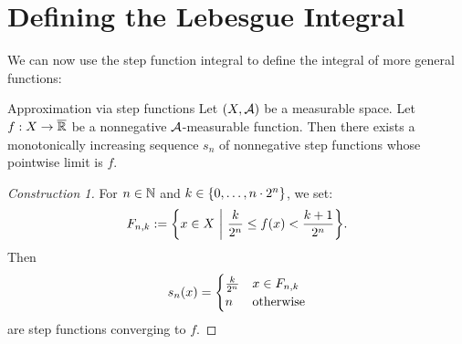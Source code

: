 \section{Defining the Lebesgue Integral}
We can now use the step function integral to define the integral of more general functions:
\begin{importanttheorem}{Approximation via step functions}{}
	Let $(X, \mathcal{A})$ be a measurable space. Let $f : X \to \overline{{\mathbb{R}}}$ be a nonnegative $\mathcal{A}$-measurable function. Then there exists a monotonically increasing sequence $s_n$ of nonnegative step functions whose pointwise limit is $f$.
\end{importanttheorem}
\begin{proof}[Construction 1]
	For $n \in \mathbb{N}$ and $k \in \qty{0, \hdots, n \cdot 2^n}$, we set:
	\begin{align*}
		F_{n,k} := \qty{x \in X ~\middle|~\frac{k}{2^n} \leq f(x) < \frac{k+1}{2^n}}.
	\end{align*}
	Then
	\begin{align*}
		s_n(x) = 
		\begin{cases}
			\frac{k}{2^n}& x \in F_{n,k}\\
			n & \textnormal{otherwise}
		\end{cases}
	\end{align*}
	are step functions converging to $f$.
\end{proof}
